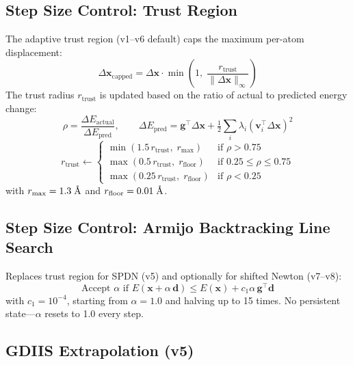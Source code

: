 \documentclass[11pt,a4paper]{article}
\newcommand{\vect}[1]{\mathbf{#1}}
\newcommand{\evec}{\vect{v}}
\newcommand{\eval}{\lambda}
\newcommand{\angstrom}{\text{\r{A}}}
\begin{document}
\subsection{Step Size Control: Trust Region}
\label{sec:trust-region}

The adaptive trust region (v1--v6 default) caps the maximum per-atom displacement:
\begin{equation}
  \Delta\vect{x}_\text{capped} = \Delta\vect{x} \cdot \min\!\left(1,\; \frac{r_\text{trust}}{\|\Delta\vect{x}\|_\infty}\right)
\end{equation}
The trust radius $r_\text{trust}$ is updated based on the ratio of actual to predicted energy change:
\begin{equation}
  \rho = \frac{\Delta E_\text{actual}}{\Delta E_\text{pred}}, \qquad
  \Delta E_\text{pred} = \vect{g}^\top \Delta\vect{x} + \tfrac{1}{2}\sum_i \eval_i (\evec_i^\top \Delta\vect{x})^2
  \label{eq:trust-rho}
\end{equation}
\begin{equation}
  r_\text{trust} \leftarrow \begin{cases}
    \min(1.5\, r_\text{trust},\; r_\text{max}) & \text{if } \rho > 0.75 \\
    \max(0.5\, r_\text{trust},\; r_\text{floor}) & \text{if } 0.25 \leq \rho \leq 0.75 \\
    \max(0.25\, r_\text{trust},\; r_\text{floor}) & \text{if } \rho < 0.25
  \end{cases}
  \label{eq:trust-update}
\end{equation}
with $r_\text{max} = 1.3\;\angstrom$ and $r_\text{floor} = 0.01\;\angstrom$.

\subsection{Step Size Control: Armijo Backtracking Line Search}
\label{sec:line-search}

Replaces trust region for SPDN (v5) and optionally for shifted Newton (v7--v8):
\begin{equation}
  \text{Accept } \alpha \text{ if } E(\vect{x} + \alpha\,\vect{d}) \leq E(\vect{x}) + c_1 \alpha\, \vect{g}^\top\vect{d}
  \label{eq:armijo}
\end{equation}
with $c_1 = 10^{-4}$, starting from $\alpha = 1.0$ and halving up to 15 times. No persistent state---$\alpha$ resets to 1.0 every step.

\subsection{GDIIS Extrapolation (v5)}
\label{sec:gdiis}
\end{document}
